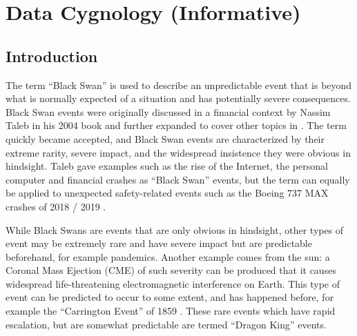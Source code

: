 %
\chapter{Data Cygnology (Informative)}\label{bkm:cygnology}
%

\section{Introduction}
The term “Black Swan” is used to describe an unpredictable event that is beyond what is normally expected of a situation and has potentially severe consequences.
Black Swan events were originally discussed in a financial context by Nassim Taleb in his 2004 book
 \cite{citation:cyg:RoleOfChance}
and further expanded to cover other topics in
\cite{citation:cyg:BlackSwan}.
The term quickly became accepted, and Black Swan events are characterized by their extreme rarity, severe impact, and the widespread insistence they were obvious in hindsight. Taleb gave examples such as the rise of the Internet, the personal computer and financial crashes as “Black Swan” events, but the term can equally be applied to unexpected safety-related events such as the Boeing 737 MAX crashes of 2018 / 2019 \cite{citation:cyg:737Max}.

While Black Swans are events that are only obvious in hindsight, other types of event may be extremely rare and have severe impact but are predictable beforehand, for example pandemics.
Another example comes from the sun:  a Coronal Mass Ejection (CME) of such severity can be produced that it causes widespread life-threatening electromagnetic interference on Earth.
This type of event can be predicted to occur to some extent, and has happened before, for example the “Carrington Event” of 1859 \cite{citation:cyg:carrington}.
These rare events which have rapid escalation, but are somewhat predictable are termed “Dragon King” events.

